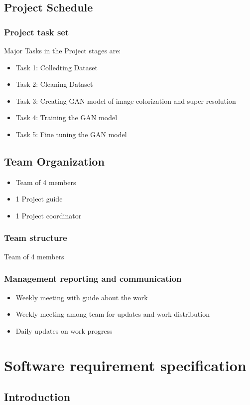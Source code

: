 \documentclass[oneside,a4paper,12pt]{report}
\begin{document}
\newpage
\section{Project Schedule}
\subsection{Project task set}
Major Tasks in the Project stages are:
\begin{itemize}
  \item Task 1: Colledting Dataset
  \item Task 2: Cleaning Dataset
  \item Task 3: Creating GAN model of image colorization and super-resolution
  \item Task 4: Training  the GAN model
  \item Task 5: Fine tuning the GAN model
\end{itemize}

\section{Team Organization}
\begin{itemize}
\item Team of 4 members
\item 1 Project guide
\item 1 Project coordinator
\end{itemize}
\subsection{Team structure}
Team of 4 members

\subsection{Management reporting and communication}
\begin{itemize}
\item Weekly meeting with guide about the work
\item Weekly meeting among team for updates and work distribution
\item Daily updates on work progress
\end{itemize}
\chapter{Software requirement specification }

\section{Introduction}
\end{document}
